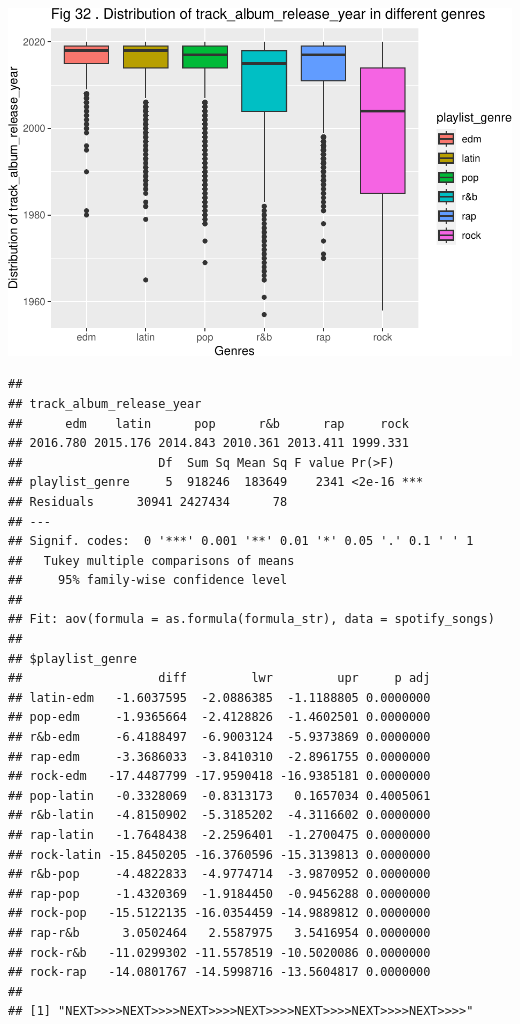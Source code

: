 \documentclass[
]{article}
\begin{document}
\includegraphics{Final-Report_files/figure-latex/unnamed-chunk-14-28.pdf}

\begin{verbatim}
## 
## track_album_release_year
##      edm    latin      pop      r&b      rap     rock 
## 2016.780 2015.176 2014.843 2010.361 2013.411 1999.331 
##                   Df  Sum Sq Mean Sq F value Pr(>F)    
## playlist_genre     5  918246  183649    2341 <2e-16 ***
## Residuals      30941 2427434      78                   
## ---
## Signif. codes:  0 '***' 0.001 '**' 0.01 '*' 0.05 '.' 0.1 ' ' 1
##   Tukey multiple comparisons of means
##     95% family-wise confidence level
## 
## Fit: aov(formula = as.formula(formula_str), data = spotify_songs)
## 
## $playlist_genre
##                   diff         lwr         upr     p adj
## latin-edm   -1.6037595  -2.0886385  -1.1188805 0.0000000
## pop-edm     -1.9365664  -2.4128826  -1.4602501 0.0000000
## r&b-edm     -6.4188497  -6.9003124  -5.9373869 0.0000000
## rap-edm     -3.3686033  -3.8410310  -2.8961755 0.0000000
## rock-edm   -17.4487799 -17.9590418 -16.9385181 0.0000000
## pop-latin   -0.3328069  -0.8313173   0.1657034 0.4005061
## r&b-latin   -4.8150902  -5.3185202  -4.3116602 0.0000000
## rap-latin   -1.7648438  -2.2596401  -1.2700475 0.0000000
## rock-latin -15.8450205 -16.3760596 -15.3139813 0.0000000
## r&b-pop     -4.4822833  -4.9774714  -3.9870952 0.0000000
## rap-pop     -1.4320369  -1.9184450  -0.9456288 0.0000000
## rock-pop   -15.5122135 -16.0354459 -14.9889812 0.0000000
## rap-r&b      3.0502464   2.5587975   3.5416954 0.0000000
## rock-r&b   -11.0299302 -11.5578519 -10.5020086 0.0000000
## rock-rap   -14.0801767 -14.5998716 -13.5604817 0.0000000
## 
## [1] "NEXT>>>>NEXT>>>>NEXT>>>>NEXT>>>>NEXT>>>>NEXT>>>>NEXT>>>>"
\end{verbatim}
\end{document}

